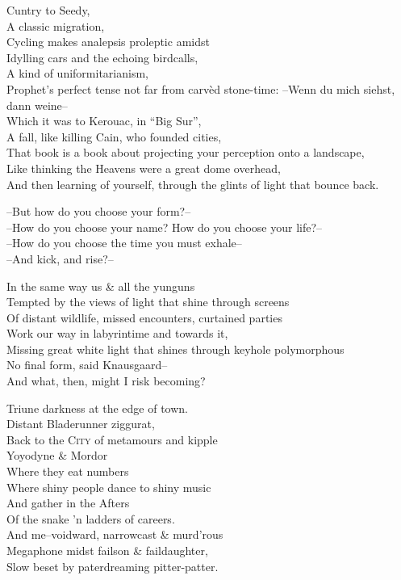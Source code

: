 Cuntry to Seedy, \\
A classic migration, \\
Cycling makes analepsis proleptic amidst \\
Idylling cars and the echoing birdcalls, \\
A kind of uniformitarianism,\\
Prophet's perfect tense not far from carvèd stone-time:
--Wenn du mich siehst, dann weine-- \\
Which it was to Kerouac, in ``Big Sur'', \\
A fall, like killing Cain, who founded cities, \\
That book is a book about projecting your perception onto a landscape, \\
Like thinking the Heavens were a great dome overhead, \\
And then learning of yourself, through the glints of light that bounce back.

--But how do you choose your form?-- \\
--How do you choose your name? How do you choose your life?-- \\
--How do you choose the time you must exhale-- \\
--And kick, and rise?--

In the same way us \& all the yunguns \\
Tempted by the views of light that shine through screens \\
Of distant wildlife, missed encounters, curtained parties \\
Work our way in labyrintime and towards it, \\
Missing great white light that shines through keyhole polymorphous \\
No final form, said Knausgaard-- \\
And what, then, might I risk becoming?

Triune darkness at the edge of town. \\
Distant Bladerunner ziggurat, \\
Back to the C\textsc{ity} of metamours and kipple \\
\qquad Yoyodyne \& Mordor \\
Where they eat numbers \\
Where shiny people dance to shiny music \\
And gather in the Afters \\
Of the snake 'n ladders of careers. \\

And me--voidward, narrowcast \& murd'rous \\
Megaphone midst failson \& faildaughter, \\
Slow beset by paterdreaming pitter-patter.